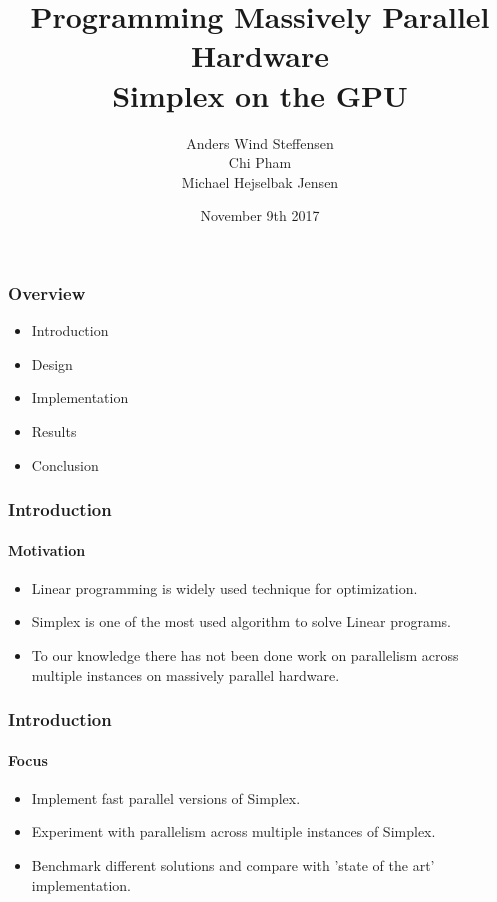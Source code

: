 \documentclass{beamer}
\title{Programming Massively Parallel Hardware\\\textbf{Simplex on the GPU}}
\author[]{%
  Anders Wind Steffensen \\
  Chi Pham \\
  Michael Hejselbak Jensen \\
}
\institute{Department of Computer Science (DIKU)\\University of Copenhagen}
\date[3/3]{November 9th 2017}
\begin{document}
\titleslide


\begin{frame}
  \frametitle{Overview}
  \begin{itemize}
  \item Introduction
  \item Design
  \item Implementation
  \item Results
  \item Conclusion
  \end{itemize}
\end{frame}


\begin{frame}
\frametitle{Introduction}
\framesubtitle{Motivation}
\begin{itemize}
	\item Linear programming is widely used technique for optimization.
	\item Simplex is one of the most used algorithm to solve Linear programs.
	\item To our knowledge there has not been done work on parallelism across multiple instances on massively parallel hardware.
\end{itemize}
\end{frame}

\begin{frame}
\frametitle{Introduction}
\framesubtitle{Focus}
\begin{itemize}
\item Implement fast parallel versions of Simplex.
\item Experiment with parallelism across multiple instances of Simplex.
\item Benchmark different solutions and compare with 'state of the art' implementation.
\end{itemize}
\end{frame}
\end{document}
